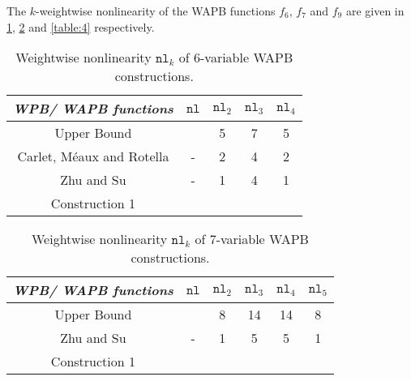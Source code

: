 \documentclass{article}[12pt]
\newcommand{\nl}{\mathtt{nl}}
\begin{document}
The $k$-weightwise nonlinearity of the WAPB functions $f_6$, $f_7$ and $f_9$ are given in \ref{table:1}, \ref{table:2} and \ref{table:4} respectively. 



\begin{table}
	\centering
	\begin{tabular}{ | c | c | c | c | c | }
		\hline
		\textit{WPB/ WAPB functions} & $\nl$ & $\nl_2$ & $\nl_3$ & $\nl_4$   \\
		\hline
		Upper Bound \cite{CMR17} &    &  5  & 7  &  5   \\  
		Carlet, M\'{e}aux and Rotella \cite{CMR17}& - & 2 & 4 & 2  \\
		Zhu and Su \cite[$f_n$ equation(8)]{ZS22}& - & 1 & 4 & 1  \\
		Construction 1 &  &  &  &     \\
		\hline
	\end{tabular}
	\caption{Weightwise nonlinearity $\nl_k$ of 6-variable WAPB constructions.}
	\label{table:1}
\end{table}


\begin{table} 
	\centering
	\begin{tabular}{ | c | c | c | c | c | c | }
		\hline
		\textit{WPB/ WAPB functions} & $\nl$ & $\nl_2$ & $\nl_3$ & $\nl_4$ & $\nl_5$  \\
		\hline
		Upper Bound \cite{CMR17} &    &  8 & 14  &  14 &  8  \\   
		Zhu and Su \cite[$f_n$ equation(8)]{ZS22}& - & 1 & 5 & 5 & 1 \\
		Construction 1 &  &  &  &  &   \\
		\hline
	\end{tabular}
	\caption{Weightwise nonlinearity $\nl_k$ of 7-variable WAPB constructions.}
	\label{table:2}
\end{table}
\end{document}
